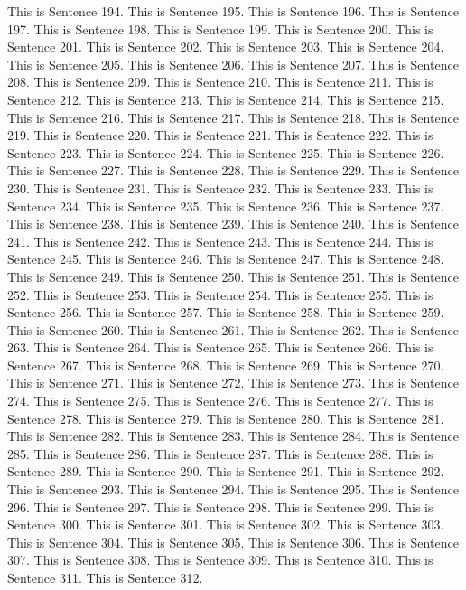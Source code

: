 \documentclass{article}
\begin{document}
This is Sentence 194.
This is Sentence 195.
This is Sentence 196.
This is Sentence 197.
This is Sentence 198.
This is Sentence 199.
This is Sentence 200.
This is Sentence 201.
This is Sentence 202.
This is Sentence 203.
This is Sentence 204.
This is Sentence 205.
This is Sentence 206.
This is Sentence 207.
This is Sentence 208.
This is Sentence 209.
This is Sentence 210.
This is Sentence 211.
This is Sentence 212.
This is Sentence 213.
This is Sentence 214.
This is Sentence 215.
This is Sentence 216.
This is Sentence 217.
This is Sentence 218.
This is Sentence 219.
This is Sentence 220.
This is Sentence 221.
This is Sentence 222.
This is Sentence 223.
This is Sentence 224.
This is Sentence 225.
This is Sentence 226.
This is Sentence 227.
This is Sentence 228.
This is Sentence 229.
This is Sentence 230.
This is Sentence 231.
This is Sentence 232.
This is Sentence 233.
This is Sentence 234.
This is Sentence 235.
This is Sentence 236.
This is Sentence 237.
This is Sentence 238.
This is Sentence 239.
This is Sentence 240.
This is Sentence 241.
This is Sentence 242.
This is Sentence 243.
This is Sentence 244.
This is Sentence 245.
This is Sentence 246.
This is Sentence 247.
This is Sentence 248.
This is Sentence 249.
This is Sentence 250.
This is Sentence 251.
This is Sentence 252.
This is Sentence 253.
This is Sentence 254.
This is Sentence 255.
This is Sentence 256.
This is Sentence 257.
This is Sentence 258.
This is Sentence 259.
This is Sentence 260.
This is Sentence 261.
This is Sentence 262.
This is Sentence 263.
This is Sentence 264.
This is Sentence 265.
This is Sentence 266.
This is Sentence 267.
This is Sentence 268.
This is Sentence 269.
This is Sentence 270.
This is Sentence 271.
This is Sentence 272.
This is Sentence 273.
This is Sentence 274.
This is Sentence 275.
This is Sentence 276.
This is Sentence 277.
This is Sentence 278.
This is Sentence 279.
This is Sentence 280.
This is Sentence 281.
This is Sentence 282.
This is Sentence 283.
This is Sentence 284.
This is Sentence 285.
This is Sentence 286.
This is Sentence 287.
This is Sentence 288.
This is Sentence 289.
This is Sentence 290.
This is Sentence 291.
This is Sentence 292.
This is Sentence 293.
This is Sentence 294.
This is Sentence 295.
This is Sentence 296.
This is Sentence 297.
This is Sentence 298.
This is Sentence 299.
This is Sentence 300.
This is Sentence 301.
This is Sentence 302.
This is Sentence 303.
This is Sentence 304.
This is Sentence 305.
This is Sentence 306.
This is Sentence 307.
This is Sentence 308.
This is Sentence 309.
This is Sentence 310.
This is Sentence 311.
This is Sentence 312.
\end{document}
